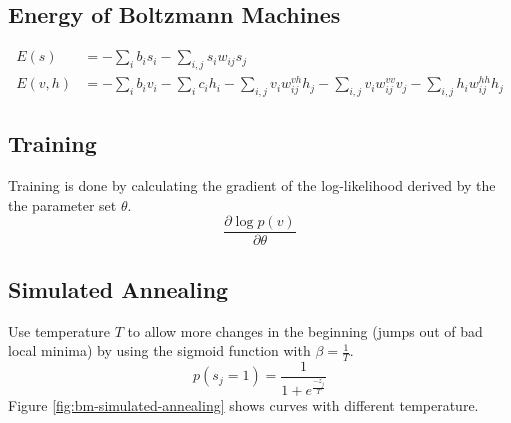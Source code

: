 


\subsection{Energy of Boltzmann Machines}
\begin{align}\label{eq:bm-energy}
E(s) &= - \sum_i b_i s_i - \sum_{i,j} s_i w_{ij} s_j\\
E(v,h) &= - \sum_i b_i v_i - \sum_i c_i h_i - \sum_{i,j} v_i w_{ij}^{vh} h_j - \sum_{i,j} v_i w_{ij}^{vv} v_j - \sum_{i,j} h_i w_{ij}^{hh} h_j
\end{align}

\subsection{Training}
Training is done by calculating the gradient of the log-likelihood derived by the the parameter set $\theta$.
\begin{equation}
\frac{\partial \log p(v)}{\partial \theta}
\end{equation}


\subsection{Simulated Annealing}
Use temperature $T$ to allow more changes in the beginning (\eg jumps out of bad local minima) by using the sigmoid function with $\beta=\frac{1}{T}$.
\begin{equation}
p(s_j = 1) = \frac{1}{1 + e^{\frac{-z_j}{T}}}
\end{equation}
Figure \ref{fig:bm-simulated-annealing} shows curves with different temperature.

